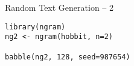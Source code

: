 \begin{frame}[fragile]{Random Text Generation -- 2}

\begin{verbatim}
library(ngram)
ng2 <- ngram(hobbit, n=2)

babble(ng2, 128, seed=987654)
\end{verbatim}

\end{frame}
